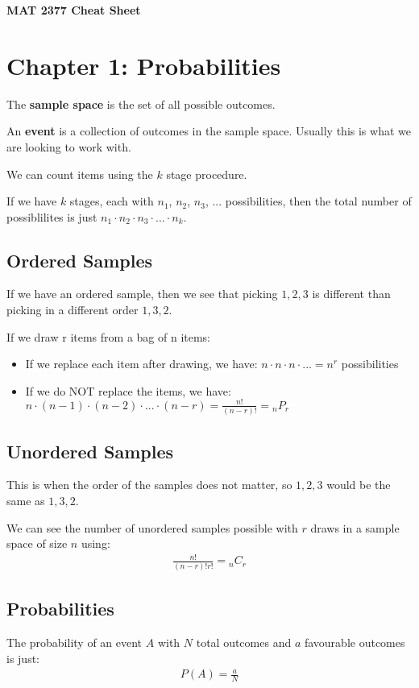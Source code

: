 \documentclass[12pt,letterpaper]{article} \usepackage{amsmath} \usepackage{graphicx} \usepackage[margin=1in]{geometry} \usepackage{longtable}  \usepackage{amssymb}
\begin{document}
	
	\begin{center}
		\Large\textbf{MAT 2377 Cheat Sheet} \\
		\vspace{0.5em}
	\end{center}
	
	\section{Chapter 1: Probabilities}
	The \textbf{sample space} is the set of all possible outcomes. 
	
	An \textbf{event} is a collection of outcomes in the sample space. Usually this is what we are looking to work with. 
	
	We can count items using the $k$ stage procedure. 
	
	If we have $k$ stages, each with $n_1$, $n_2$, $n_3$, ... possibilities, then the total number of possiblilites is just $n_1\cdot n_2\cdot n_3\cdot ...\cdot n_k$.
	
	\subsection{Ordered Samples}
	If we have an ordered sample, then we see that picking $1, 2, 3$ is different than picking in a different order $1, 3, 2$.
	
	If we draw r items from a bag of n items:
	\begin{itemize}[]
		\item If we replace each item after drawing, we have: $n\cdot n\cdot n\cdot ... = n^r$ possibilities
		\item If we do NOT replace the items, we have: $n\cdot (n-1)\cdot (n-2)\cdot ...\cdot (n-r) = \frac{n!}{(n-r)!}= {}_nP_r$
	\end{itemize}
	
	\subsection{Unordered Samples}
	This is when the order of the samples does not matter, so $1,2,3$ would be the same as $1,3,2$. 
	
	We can see the number of unordered samples possible with $r$ draws in a sample space of size $n$ using:
	\begin{align*}
		\frac{n!}{(n-r)!r!} = {}_nC_r
	\end{align*}
	
	\subsection{Probabilities}
	The probability of an event $A$ with $N$ total outcomes and $a$ favourable outcomes is just:
	\begin{align*}
		P(A) = \frac{a}{N}
	\end{align*}
	
\end{document}
